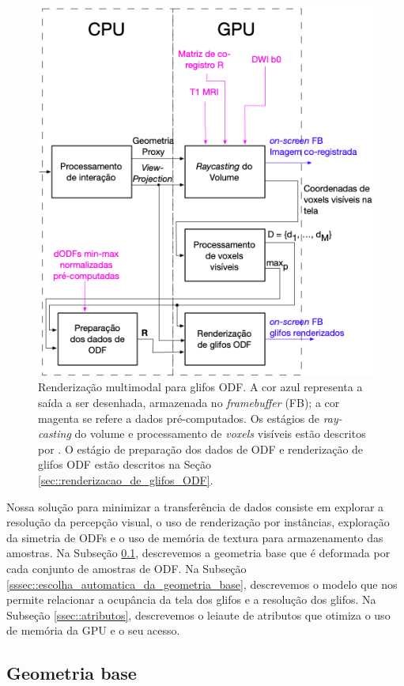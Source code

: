 \begin{figure}[ht]
    \centering
    \includegraphics[width=.7\linewidth, angle=0]{figs/Esquema_Glifo/fluxograma_glifos_VMTK.png}
    \caption{
    Renderização multimodal para glifos ODF. A cor azul representa a saída a ser desenhada, armazenada no \textit{framebuffer} (FB); a cor magenta se refere a dados pré-computados. Os estágios de \textit{ray-casting} do volume e processamento de \textit{voxels} visíveis estão descritos por . O estágio de preparação dos dados de ODF e renderização de glifos ODF estão descritos na Seção \ref{sec::renderizacao_de_glifos_ODF}.
    }
    \label{fig::vmtk_simplified}
\end{figure}

Nossa solução para minimizar a transferência de dados consiste em explorar a resolução da percepção visual, o uso de renderização por instâncias, exploração da simetria de ODFs e o uso de memória de textura para armazenamento das amostras. Na Subseção \ref{ssec::geometria_base}, descrevemos a geometria base que é deformada por cada conjunto de amostras de ODF. Na Subseção \ref{sssec::escolha_automatica_da_geometria_base}, descrevemos o modelo que nos permite relacionar a ocupância da tela dos glifos e a resolução dos glifos. Na Subseção \ref{ssec::atributos}, descrevemos o leiaute de atributos que otimiza o uso de memória da GPU e o seu acesso.

\subsection{Geometria base}
\label{ssec::geometria_base}

